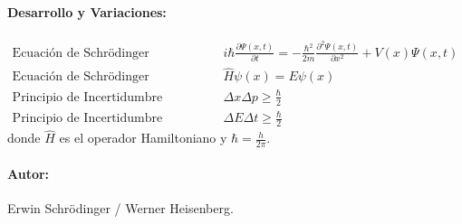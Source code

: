 \documentclass[12pt,a4paper]{article}
\begin{document}
\paragraph*{Desarrollo y Variaciones:}
\begin{align*}
\text{Ecuación de Schrödinger dependiente del tiempo (1D):} \quad & i \hbar \frac{\partial \Psi(x,t)}{\partial t} = -\frac{\hbar^2}{2m} \frac{\partial^2 \Psi(x,t)}{\partial x^2} + V(x) \Psi(x,t) \\
\text{Ecuación de Schrödinger independiente del tiempo:} \quad & \hat{H} \psi(x) = E \psi(x) \\
\text{Principio de Incertidumbre Posición-Momento:} \quad & \Delta x \Delta p \ge \frac{\hbar}{2} \\
\text{Principio de Incertidumbre Energía-Tiempo:} \quad & \Delta E \Delta t \ge \frac{\hbar}{2}
\end{align*}
donde $\hat{H}$ es el operador Hamiltoniano y $\hbar = \frac{h}{2\pi}$.
\paragraph*{Autor:} Erwin Schrödinger / Werner Heisenberg.
\end{document}
